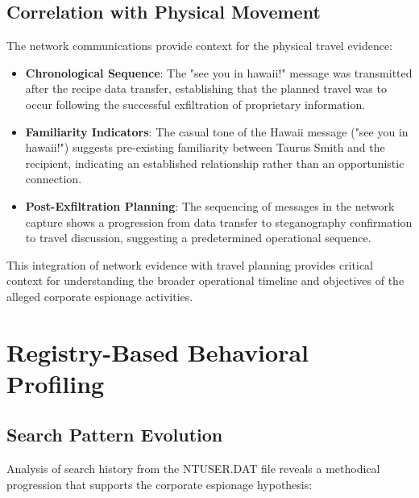 \subsection{Correlation with Physical Movement}
The network communications provide context for the physical travel evidence:

\begin{itemize}
    \item \textbf{Chronological Sequence}: The "see you in hawaii!" message was transmitted after the recipe data transfer, establishing that the planned travel was to occur following the successful exfiltration of proprietary information.
    
    \item \textbf{Familiarity Indicators}: The casual tone of the Hawaii message ("see you in hawaii!") suggests pre-existing familiarity between Taurus Smith and the recipient, indicating an established relationship rather than an opportunistic connection.
    
    \item \textbf{Post-Exfiltration Planning}: The sequencing of messages in the network capture shows a progression from data transfer to steganography confirmation to travel discussion, suggesting a predetermined operational sequence.
\end{itemize}

This integration of network evidence with travel planning provides critical context for understanding the broader operational timeline and objectives of the alleged corporate espionage activities.

\section{Registry-Based Behavioral Profiling}
\subsection{Search Pattern Evolution}
Analysis of search history from the NTUSER.DAT file reveals a methodical progression that supports the corporate espionage hypothesis:

